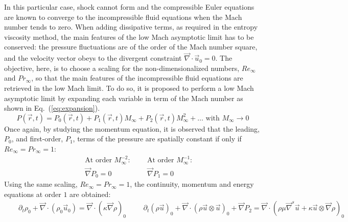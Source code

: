 \documentclass[preprint,10pt]{elsarticle}
\renewcommand{\div}{\vec{\nabla}\! \cdot \!}
\newcommand{\grad}{\vec{\nabla}}
\newcommand{\eqt}[1]{Eq.~(\ref{#1})}                     %
\begin{document}
\begin{itemize}
In this particular case, shock cannot form and the compressible Euler equations are known to converge to the incompressible fluid equations when the Mach number tends to zero. When adding dissipative terms, as required in the entropy viscosity method, the main features of the low Mach asymptotic limit has to be conserved: the pressure fluctuations are of the order of the Mach number square, and the velocity vector obeys to the divergent constraint $\div \vec{u}_0 = 0$. The objective, here, is to choose a scaling for the non-dimensionalized numbers, $Re_{\infty}$ and $Pr_{\infty}$, so that the main features of the incompressible fluid equations are retrieved in the low Mach limit. To do so, it is proposed to perform a low Mach asymptotic limit by expanding each variable in term of the Mach number as shown in \eqt{eq:expansion}. 
\begin{equation}
\label{eq:expansion}
P(\vec{r}, t) = P_0(\vec{r}, t) + P_1(\vec{r}, t) M_{\infty} + P_2(\vec{r}, t) M_{\infty}^2 + \dots \text{ with } M_{\infty} \to 0
\end{equation}
Once again, by studying the momentum equation, it is observed that the leading, $P_0$, and first-order, $P_1$, terms of the pressure are spatially constant if only if $Re_{\infty} = Pr_{\infty} = 1$:
 \begin{subequations}\label{eq:asympt_equ1}
 \begin{eqnarray}\label{eq:asympt_equ1_cont}
&&\text{At order $M_{\infty}^{-2}$:} \nonumber\\
&& \grad P_0 = 0
 \end{eqnarray}
\begin{eqnarray}\label{eq:asympt_equ1_mom}
&& \text{At order $M_{\infty}^{-1}$:} \nonumber\\
&&\grad P_1 = 0
  \end{eqnarray}
 \end{subequations}
Using the same scaling, $Re_{\infty} = Pr_{\infty} = 1$, the continuity, momentum and energy equations at order $1$ are obtained:
\begin{subequations}\label{eq:asympt_equ2}
\begin{eqnarray}\label{eq:asympt_equ2_cont}
 &&\partial_t \rho_0 + \div ( \rho_0 \vec{u}_0 ) = \div ( \kappa \grad \rho )_0
 \end{eqnarray}
 \begin{eqnarray}\label{eq:asympt_equ2_mom}
 &&\partial_t (\rho \vec{u})_0 + \div ( \rho \vec{u} \otimes \vec{u})_0 + \grad P_2 = \div (\rho \mu \grad^s \vec{u} +\kappa \vec{u} \otimes \grad \rho )_0

\end{eqnarray}
\end{subequations}
\end{itemize}
\end{document}
